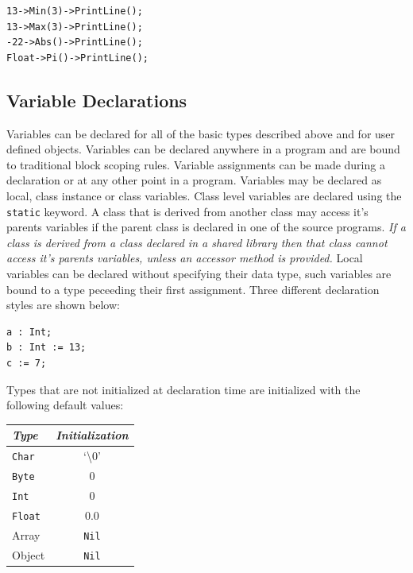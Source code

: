 \documentclass[12pt]{article}
\begin{document}
\begin{verbatim}
13->Min(3)->PrintLine();
13->Max(3)->PrintLine();
-22->Abs()->PrintLine();
Float->Pi()->PrintLine();
\end{verbatim}

\subsection{Variable Declarations}
Variables can be declared for all of the basic types described above and for user defined objects. Variables can be declared anywhere in a program and are bound to traditional block scoping rules.  Variable assignments can be made during a declaration or at any other point in a program. Variables may be declared as local, class instance or class variables.  Class level variables are declared using the \texttt{static} keyword. A class that is derived from another class may access it's parents variables if the parent class is declared in one of the source programs.  \textit{If a class is derived from a class declared in a shared library then that class cannot access it's parents variables, unless an accessor method is provided.}  Local variables can be declared without specifying their data type, such variables are bound to a type peceeding their first assignment. Three different declaration styles are shown below:

\begin{verbatim}
a : Int;
b : Int := 13;
c := 7;
\end{verbatim}

Types that are not initialized at declaration time are initialized with the following default values:

\vspace{\baselineskip}
\begin{center}
\begin{tabular}{| l | c |}
\hline
\emph{Type} & \emph{Initialization} \\ \hline \hline
\texttt{Char} & `\textbackslash0' \\ \hline
\texttt{Byte} & 0 \\ \hline
\texttt{Int} & 0 \\ \hline
\texttt{Float} & 0.0 \\ \hline
Array & \texttt{Nil} \\ \hline
Object & \texttt{Nil} \\ \hline
\end{tabular}
\end{center}
\end{document}
